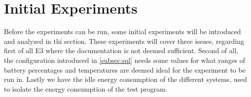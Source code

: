 \section{Initial Experiments}

Before the experiments can be run, some initial experiments will be introduced and analyzed in thi section. These experiments will cover three issues, regarding first of all E3 where the documentation is not deemed sufficient. Second of all, the configuration introduced in \cref{subsec:sql} needs some values for what ranges of battery percentages and temperatures are deemed ideal for the experiment to be run in. Lastly we have the idle energy consumption of the different systems, used to isolate the energy consumption of the test program. 



